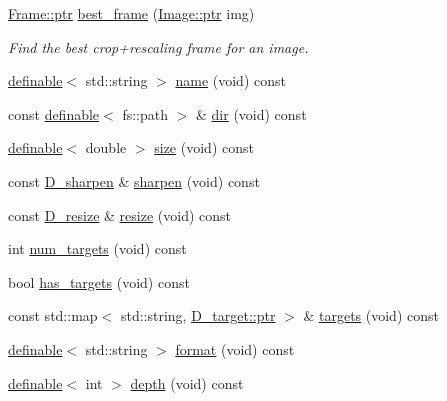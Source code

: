 \begin{DoxyCompactItemize}
\hyperlink{class_photo_finish_1_1_frame_aaf5eaa56b8096024c0d45ad9e7f5e6c1}{Frame\+::ptr} \hyperlink{class_photo_finish_1_1_destination_a43389654149563e9d50e1eeb85a8301a}{best\+\_\+frame} (\hyperlink{class_photo_finish_1_1_image_ab336203305ed3a1397d7245063353b5a}{Image\+::ptr} img)
\begin{DoxyCompactList}\small\item\em Find the best crop+rescaling frame for an image. \end{DoxyCompactList}\item 
\hyperlink{class_photo_finish_1_1definable}{definable}$<$ std\+::string $>$ \hyperlink{class_photo_finish_1_1_destination_a96d21769385305f7b9168b43ba562019}{name} (void) const
\item 
const \hyperlink{class_photo_finish_1_1definable}{definable}$<$ fs\+::path $>$ \& \hyperlink{class_photo_finish_1_1_destination_aba22559bce295d7356ecd0c8ec0e4b61}{dir} (void) const
\item 
\hyperlink{class_photo_finish_1_1definable}{definable}$<$ double $>$ \hyperlink{class_photo_finish_1_1_destination_a8387f100c12f0cac437ca0bd6df22aa5}{size} (void) const
\item 
const \hyperlink{class_photo_finish_1_1_d__sharpen}{D\+\_\+sharpen} \& \hyperlink{class_photo_finish_1_1_destination_ad978b29930e366de32ff34e412ab935c}{sharpen} (void) const
\item 
const \hyperlink{class_photo_finish_1_1_d__resize}{D\+\_\+resize} \& \hyperlink{class_photo_finish_1_1_destination_af9af85210edbf3e6ddb7435f6880e980}{resize} (void) const
\item 
int \hyperlink{class_photo_finish_1_1_destination_a9b605477d0d0479c1dd8f897004e600b}{num\+\_\+targets} (void) const
\item 
bool \hyperlink{class_photo_finish_1_1_destination_a7a462f41086060cb10f01d4838f0a576}{has\+\_\+targets} (void) const
\item 
const std\+::map$<$ std\+::string, \hyperlink{class_photo_finish_1_1_d__target_a44befb9c758d25b0c765e97caa1caa39}{D\+\_\+target\+::ptr} $>$ \& \hyperlink{class_photo_finish_1_1_destination_a4c0d0bd1588471d13e0ab067ab129f7b}{targets} (void) const
\item 
\hyperlink{class_photo_finish_1_1definable}{definable}$<$ std\+::string $>$ \hyperlink{class_photo_finish_1_1_destination_ac3e539fafa18892508dfb98cf68f29db}{format} (void) const
\item 
\hyperlink{class_photo_finish_1_1definable}{definable}$<$ int $>$ \hyperlink{class_photo_finish_1_1_destination_ae0711c1707ae64456eea948090030639}{depth} (void) const

\end{DoxyCompactItemize}

